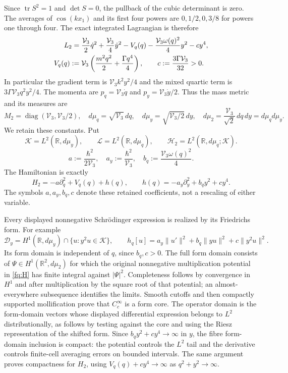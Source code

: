 Since $\operatorname{tr}S^2=1$ and $\det S=0$, the pullback of the
cubic determinant is zero. The averages of $\cos(kx_1)$ and its first
four powers are $0,1/2,0,3/8$ for powers one through four. The exact
integrated Lagrangian is therefore
\begin{align}
 L_2={}&\frac{\mathcal V_3}{2}\dot q^2
       +\frac{\mathcal V_3}{4}\dot y^2
       -V_q(q)-\frac{\mathcal V_3\omega(q)^2}{4}y^2-cy^4,
       \label{fq:L}\\
 V_q(q):={}&\mathcal V_3\left(\frac{m^2q^2}{2}
                         +\frac{\Gamma q^4}{4}\right),\qquad
 c:=\frac{3\Gamma\mathcal V_3}{32}>0.\notag
\end{align}
In particular the gradient term is $\mathcal V_3k^2y^2/4$ and the
mixed quartic term is $3\Gamma\mathcal V_3q^2y^2/4$.
The momenta are $p_q=\mathcal V_3\dot q$ and
$p_y=\mathcal V_3\dot y/2$. Thus the mass metric and its measures are
\[
 M_2=\operatorname{diag}(\mathcal V_3,\mathcal V_3/2),\quad
 d\mu_q=\sqrt{\mathcal V_3}\,dq,\quad
 d\mu_y=\sqrt{\mathcal V_3/2}\,dy,\quad
 d\mu_2=\frac{\mathcal V_3}{\sqrt2}\,dq\,dy=d\mu_qd\mu_y.
\]
We retain these constants. Put
\[
 \mathscr K=L^2(\mathbb R,d\mu_y),\qquad
 \mathscr L=L^2(\mathbb R,d\mu_q),\qquad
 \mathscr H_2=L^2(\mathbb R,d\mu_q;\mathscr K).
\]
\[
 a:=\frac{\hbar^2}{2\mathcal V_3},\quad
 a_y:=\frac{\hbar^2}{\mathcal V_3},\quad
 b_q:=\frac{\mathcal V_3\omega(q)^2}{4}.
\]
The Hamiltonian is exactly
\begin{equation}\label{fq:H}
 H_2=-a\partial_q^2+V_q(q)+h(q),\qquad
 h(q)=-a_y\partial_y^2+b_qy^2+cy^4.
\end{equation}
The symbols $a,a_y,b_q,c$ denote these retained coefficients, not a
rescaling of either variable.

Every displayed nonnegative Schr\"odinger expression is realized by
its Friedrichs form. For example
\[
 \mathcal D_y=H^1(\mathbb R,d\mu_y)
                  \cap\{u:y^2u\in\mathscr K\},\qquad
 h_q[u]=a_y\|u'\|^2+b_q\|yu\|^2+c\|y^2u\|^2.
\]
Its form domain is independent of $q$, since $b_q,c>0$.
The full form domain consists of $\Psi\in H^1(\mathbb R^2,d\mu_2)$
for which the original nonnegative multiplication potential in
\eqref{fq:H} has finite integral against $|\Psi|^2$.
Completeness follows by convergence in $H^1$ and after multiplication
by the square root of that potential; an almost-everywhere subsequence
identifies the limits. Smooth cutoffs and then compactly supported
mollification prove that $C_c^\infty$ is a form core. The operator
domain is the form-domain vectors whose displayed differential
expression belongs to $L^2$ distributionally, as follows by testing
against the core and using the Riesz representation of the shifted form.
Since $b_qy^2+cy^4\to\infty$ in $y$, the fibre form-domain inclusion
is compact: the potential controls the $L^2$ tail and the derivative
controls finite-cell averaging errors on bounded intervals.
The same argument proves compactness for $H_2$, using
$V_q(q)+cy^4\to\infty$ as $q^2+y^2\to\infty$.


